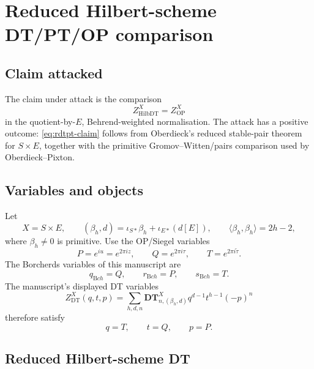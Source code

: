 \section{Reduced Hilbert-scheme DT/PT/OP comparison}
\label{sec:reduced-dt-pt-op-comparison}

\subsection{Claim attacked}

The claim under attack is the comparison
\begin{equation}
\label{eq:rdtpt-claim}
Z^X_{\mathrm{HilbDT}}=Z^X_{\mathrm{OP}}
\end{equation}
in the quotient-by-\(E\), Behrend-weighted normalisation.  The attack
has a positive outcome: \eqref{eq:rdtpt-claim} follows from
Oberdieck's reduced stable-pair theorem for \(S\times E\), together
with the primitive Gromov--Witten/pairs comparison used by
Oberdieck--Pixton.

\subsection{Variables and objects}

Let
\begin{equation}
\label{eq:rdtpt-x-class}
X=S\times E,\qquad
(\beta_h,d)=\iota_{S*}\beta_h+\iota_{E*}(d[E]),
\qquad
\langle\beta_h,\beta_h\rangle=2h-2,
\end{equation}
where \(\beta_h\neq0\) is primitive.  Use the OP/Siegel variables
\begin{equation}
\label{eq:rdtpt-op-vars}
P=e^{iu}=e^{2\pi iz},\qquad
Q=e^{2\pi i\tau},\qquad
T=e^{2\pi i\widetilde\tau}.
\end{equation}
The Borcherds variables of this manuscript are
\begin{equation}
\label{eq:rdtpt-borch-vars}
q_{\mathrm Bch}=Q,\qquad r_{\mathrm Bch}=P,\qquad s_{\mathrm Bch}=T.
\end{equation}
The manuscript's displayed DT variables
\[
Z^X_{\mathrm{DT}}(q,t,p)
=
\sum_{h,d,n}\mathbf{DT}^X_{n,(\beta_h,d)}
q^{d-1}t^{h-1}(-p)^n
\]
therefore satisfy
\begin{equation}
\label{eq:rdtpt-manuscript-map}
q=T,\qquad t=Q,\qquad p=P.
\end{equation}

\subsection{Reduced Hilbert-scheme DT}

